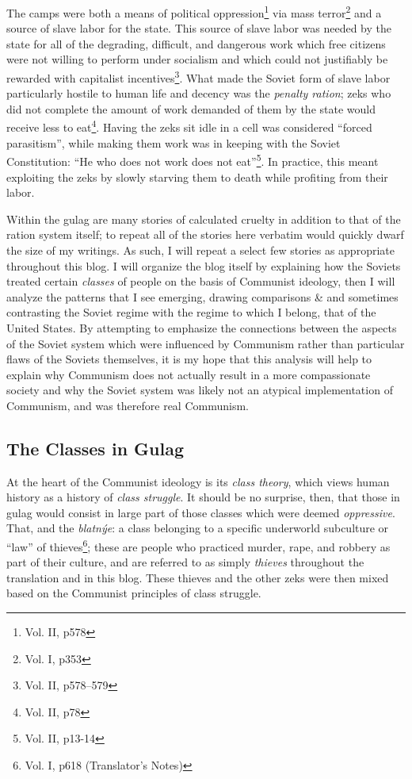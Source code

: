 \documentclass{article}
\begin{document}
The camps were both a means of political oppression\footnote{Vol. II, p578} via mass terror\footnote{Vol. I, p353} and a source of slave labor for the state.  This source of slave labor was needed by the state for all of the degrading, difficult, and dangerous work which free citizens were not willing to perform under socialism and which could not justifiably be rewarded with capitalist incentives\footnote{Vol. II, p578--579}.  What made the Soviet form of slave labor particularly hostile to human life and decency was the \emph{penalty ration}; zeks who did not complete the amount of work demanded of them by the state would receive less to eat\footnote{Vol. II, p78}.  Having the zeks sit idle in a cell was considered ``forced parasitism'', while making them work was in keeping with the Soviet Constitution: ``He who does not work does not eat''\footnote{Vol. II, p13-14}.  In practice, this meant exploiting the zeks by slowly starving them to death while profiting from their labor.

Within the gulag are many stories of calculated cruelty in addition to that of the ration system itself; to repeat all of the stories here verbatim would quickly dwarf the size of my writings.  As such, I will repeat a select few stories as appropriate throughout this blog.  I will organize the blog itself by explaining how the Soviets treated certain \emph{classes} of people on the basis of Communist ideology, then I will analyze the patterns that I see emerging, drawing comparisons \& and sometimes contrasting the Soviet regime with the regime to which I belong, that of the United States.  By attempting to emphasize the connections between the aspects of the Soviet system which were influenced by Communism rather than particular flaws of the Soviets themselves, it is my hope that this analysis will help to explain why Communism does not actually result in a more compassionate society and why the Soviet system was likely not an atypical implementation of Communism, and was therefore real Communism.

\subsection{The Classes in Gulag}
At the heart of the Communist ideology is its \emph{class theory}, which views human history as a history of \emph{class struggle}.  It should be no surprise, then, that those in gulag would consist in large part of those classes which were deemed \emph{oppressive}.  That, and the \emph{blatn\'{y}e}: a class belonging to a specific underworld subculture or ``law'' of thieves\footnote{Vol. I, p618 (Translator's Notes)}; these are people who practiced murder, rape, and robbery as part of their culture, and are referred to as simply \emph{thieves} throughout the translation and in this blog.  These thieves and the other zeks were then mixed based on the Communist principles of class struggle.
\end{document}
